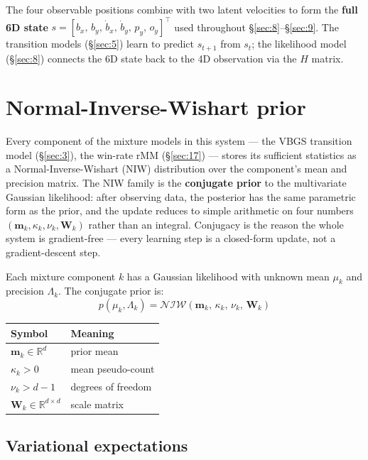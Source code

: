 \documentclass[12pt, a4paper]{article}
\newcommand{\R}{\mathbb{R}}
\newcommand{\1}{\mathbf{1}}
\newcommand{\cNIW}{\mathcal{NIW}}
\begin{document}
The four observable positions combine with two latent velocities to form the
\textbf{full 6D state}
$s = [b_x,\, b_y,\, \dot b_x,\, \dot b_y,\, p_y,\, o_y]^\top$ used throughout
\S\ref{sec:8}--\S\ref{sec:9}.  The transition models (\S\ref{sec:5}) learn to
predict $s_{t+1}$ from $s_t$; the likelihood model (\S\ref{sec:8}) connects the
6D state back to the 4D observation via the $H$ matrix.

\section{Normal-Inverse-Wishart prior}
\label{sec:2}

Every component of the mixture models in this system --- the VBGS transition model
(\S\ref{sec:3}), the win-rate rMM (\S\ref{sec:17}) --- stores its sufficient
statistics as a Normal-Inverse-Wishart (NIW) distribution over the component's
mean and precision matrix.  The NIW family is the \textbf{conjugate prior} to the
multivariate Gaussian likelihood: after observing data, the posterior has the same
parametric form as the prior, and the update reduces to simple arithmetic on four
numbers $(\mathbf{m}_k, \kappa_k, \nu_k, \mathbf{W}_k)$ rather than an integral.
Conjugacy is the reason the whole system is gradient-free --- every learning step
is a closed-form update, not a gradient-descent step.

Each mixture component $k$ has a Gaussian likelihood with unknown mean $\mu_k$ and
precision $\Lambda_k$.  The conjugate prior is:
\[
p(\mu_k, \Lambda_k) = \cNIW(\mathbf{m}_k,\, \kappa_k,\, \nu_k,\, \mathbf{W}_k)
\]

\begin{table}[ht]
\centering
\begin{tabular}{ll}
\toprule
Symbol & Meaning \\
\midrule
$\mathbf{m}_k \in \R^d$ & prior mean \\
$\kappa_k > 0$           & mean pseudo-count \\
$\nu_k > d - 1$          & degrees of freedom \\
$\mathbf{W}_k \in \R^{d\times d}$ & scale matrix \\
\bottomrule
\end{tabular}
\end{table}

\subsection{Variational expectations}
\end{document}
